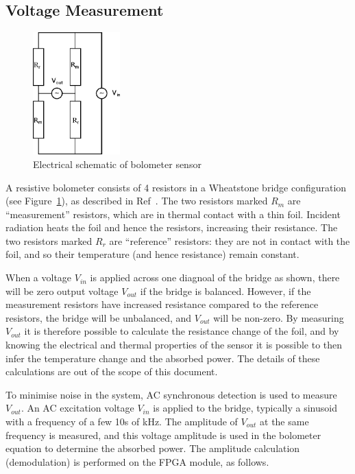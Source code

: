\documentclass[12pt,a4paper]{article}
\begin{document}
\subsection{Voltage Measurement}
\label{sec:voltage}
\begin{figure}
  \centering
  \includegraphics[width=0.3\textwidth]{sensor_schematic.eps}
  \caption{Electrical schematic of bolometer sensor\label{fig:sensor}}
\end{figure}
A resistive bolometer consists of 4 resistors in a Wheatstone bridge configuration (see Figure~\ref{fig:sensor}), as described in Ref~\cite{mast-1991}.
The two resistors marked $R_m$ are ``measurement'' resistors, which are in thermal contact with a thin foil. Incident radiation heats the foil and hence
the resistors, increasing their resistance. The two resistors marked $R_r$ are ``reference'' resistors: they are not in contact with the foil, and so their
temperature (and hence resistance) remain constant.

When a voltage $V_{in}$ is applied across one diagnoal of the bridge as shown, there will be zero output voltage $V_{out}$ if the bridge is balanced.
However, if the measurement resistors have increased resistance compared to the reference resistors, the bridge will be unbalanced, and $V_{out}$ will be
non-zero. By measuring $V_{out}$ it is therefore possible to calculate the resistance change of the foil, and by knowing the electrical and thermal
properties of the sensor it is possible to then infer the temperature change and the absorbed power. The details of these calculations are out of the
scope of this document.

To minimise noise in the system, AC synchronous detection is used to measure $V_{out}$. An AC excitation voltage $V_{in}$ is applied to the bridge,
typically a sinusoid with a frequency of a few 10s of kHz. The amplitude of $V_{out}$ at the same frequency is measured, and this voltage amplitude is
used in the bolometer equation to determine the absorbed power. The amplitude calculation (demodulation) is performed on the FPGA module, as follows.
\end{document}
